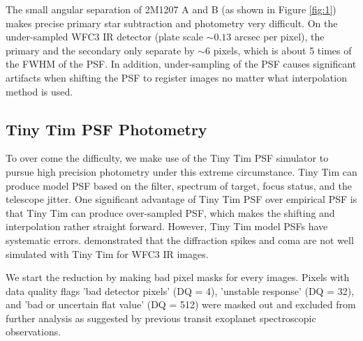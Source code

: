 \documentclass[apj]{emulateapj}
\begin{document}
The small angular separation of 2M1207 A and B (as shown in Figure
\ref{fig:1}) makes precise primary star subtraction and photometry
very difficult. On the under-sampled WFC3 IR detector (plate scale
$\sim 0.13$ arcsec per pixel), the primary and the secondary only
separate by $\sim 6$ pixels, which is about 5 times of the FWHM of the
PSF. In addition, under-sampling of the PSF causes significant
artifacts when shifting the PSF to register images no matter what
interpolation method is used.

\begin{figure*}
  \centering
  \caption{WFC3 F160W images of 2M1207A system. Upper: original image,
    lower: residual model and primary PSF subtracted. The image of
    2M1207 B is overshadowed by the halo of the image of 2M1207A and
    can be hardly seen from the original image. With a hybrid PSF
    (residual + Tiny Tim PSF) subtraction, the image of 2M1207 B is
    clearly presented.}
  \label{fig:1}
\end{figure*}
\subsection{Tiny Tim PSF Photometry}
To over come the difficulty, we make use of the Tiny Tim PSF simulator
to pursue high precision photometry under this extreme
circumstance. Tiny Tim can produce model PSF based on the filter,
spectrum of target, focus status, and the telescope jitter. One
significant advantage of Tiny Tim PSF over empirical PSF is that Tiny Tim can
produce over-sampled PSF, which makes the shifting and interpolation
rather straight forward. However, Tiny Tim model PSFs have systematic
errors. \citeauthor{Biretta2014} demonstrated that the diffraction
spikes and coma are not well simulated with Tiny Tim for WFC3 IR images.

We start the reduction by making bad pixel masks for every
images. Pixels with data quality flags 'bad detector pixels' (DQ = 4),
'unstable response' (DQ = 32), and 'bad or uncertain flat value' (DQ =
512) were masked out and excluded from further analysis as suggested
by previous transit exoplanet
spectroscopic observations\citep[e.g.][]{Berta2012, Kreidberg2014}.
\end{document}
